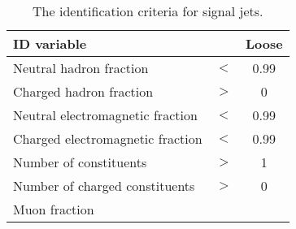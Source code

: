 \begin{table}[h!]
    \centering
    \caption{The identification criteria for signal jets.}
    \label{tb:jetID}
    \begin{tabular}{lcc}
            \textbf{ID variable}      			&		    & \textbf{Loose}  \\
            \hline
            Neutral hadron fraction 			& $<$ &	0.99 \\			
            Charged hadron fraction           	& $>$ &	0 \\		   
            Neutral electromagnetic fraction 	& $<$ &	0.99 \\		
            Charged electromagnetic fraction    & $<$ & 0.99 \\
            Number of constituents 				& $>$ &	1 \\		
			Number of charged constituents      & $>$ &	0 \\		
            Muon fraction 						&  	  & \NA{} \\		
    \end{tabular} \\
\end{table}


